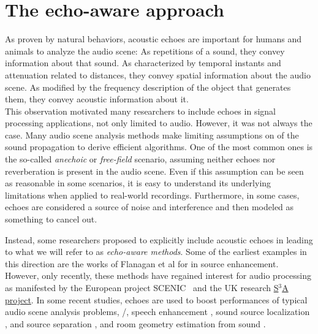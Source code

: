 \section{The echo-aware approach}
As proven by natural behaviors, acoustic echoes are important for humans and animals to analyze the audio scene:
As repetitions of a sound, they convey information about that sound.
As characterized by temporal instants and attenuation related to distances, they convey spatial information about the audio scene.
As modified by the frequency description of the object that generates them, they convey acoustic information about it.
\\This observation motivated many researchers to include echoes in signal processing applications, not only limited to audio.
However, it was not always the case.
Many audio scene analysis methods make limiting assumptions on of the sound propagation to derive efficient algorithms.
One of the most common ones is the so-called \textit{anechoic} or \textit{free-field} scenario, assuming neither echoes nor reverberation is present in the audio scene.
Even if this assumption can be seen as reasonable in some scenarios, it is easy to understand its underlying limitations when applied to real-world recordings.
Furthermore, in some cases, echoes are considered a source of noise and interference and then modeled as something to cancel out.

\mynewline
Instead, some researchers proposed to explicitly include acoustic echoes in leading to what we will refer to as \textit{echo-aware methods}.
Some of the earliest examples in this direction are the works of Flanagan et al for in source enhancement.
However, only recently, these methods have regained interest for audio processing as manifested by the European project SCENIC~ and the UK research \href{http://www.s3a-spatialaudio.org/}{S$^3$A project}.
In some recent studies, echoes are used to boost performances of typical audio scene analysis problems, \eg/, speech enhancement , sound source localization , and source separation , and room geometry estimation from sound .

